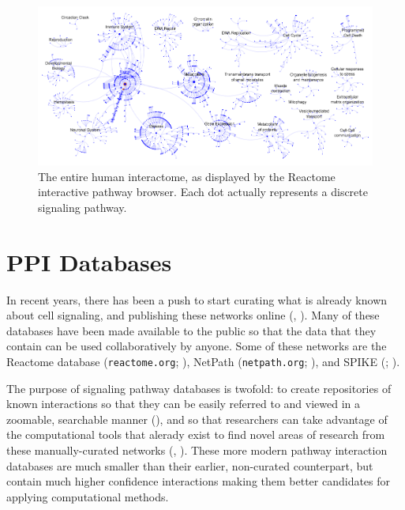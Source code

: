 \documentclass[12pt,twoside]{reedthesis}
\theoremstyle{definition}
\begin{document}
\begin{figure}[h]
  \begin{center}
    \includegraphics[width=\textwidth]{human_interactome}
  \caption[Human interactome]{The entire human interactome, as displayed by the Reactome interactive pathway browser. Each dot actually represents a discrete signaling pathway.}
  \label{fig:human_interactome}
  \end{center}
\end{figure}

\section{PPI Databases}

In recent years, there has been a push to start curating what is already known about cell signaling, and publishing these networks online (\cite{Bauer-Mehren2009}, \cite{Cusick2009}). Many of these databases have been made available to the public so that the data that they contain can be used collaboratively by anyone. Some of these networks are the Reactome database (\texttt{reactome.org}; \cite{Matthews2009}), NetPath (\texttt{netpath.org}; \cite{Kandasamy2010}), and SPIKE (; \cite{Paz2011}).\par
The purpose of signaling pathway databases is twofold: to create repositories of known interactions so that they can be easily referred to and viewed in a zoomable, searchable manner (\cite{Hu2007}), and so that researchers can take advantage of the computational tools that alerady exist to find novel areas of research from these manually-curated networks (\cite{Karlebach2008}, \cite{Battle2010}). These more modern pathway interaction databases are much smaller than their earlier, non-curated counterpart, but contain much higher confidence interactions making them better candidates for applying computational methods.\par
\end{document}
